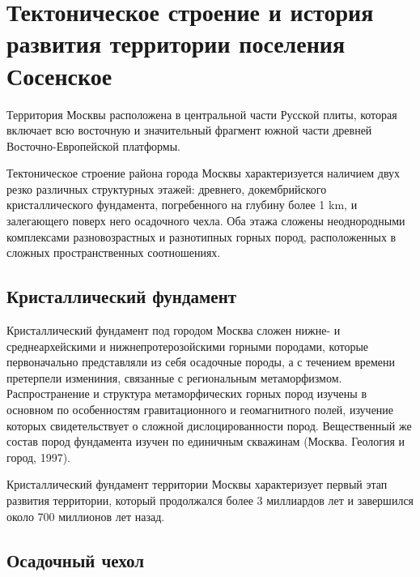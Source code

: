 \section{Тектоническое строение и история развития территории поселения Сосенское}\label{sec:ch2/sec2}

Территория Москвы расположена  в центральной части
Русской плиты, которая включает всю восточную и значительный фрагмент южной части древней
Восточно-Европейской платформы. 

Тектоническое строение района города Москвы характеризуется наличием двух резко различных
структурных этажей: древнего, докембрийского кристаллического фундамента, погребенного 
на глубину более 1 \si{\kilo\meter}, и залегающего поверх него осадочного чехла.
Оба этажа сложены неоднородными комплексами разновозрастных и разнотипных горных пород, 
расположенных в сложных пространственных соотношениях.

\subsection{Кристаллический фундамент}

Кристаллический фундамент под городом Москва сложен нижне- и среднеархейскими и 
нижнепротерозойскими горными породами, которые первоначально представляли из себя 
осадочные породы, а с течением времени претерпели измениния, связанные с региональным 
метаморфизмом. Распространение и структура метаморфических горных пород изучены в 
основном по особенностям гравитационного и геомагнитного полей, изучение которых свидетельствует 
о сложной дислоцированности пород. Вещественный же состав пород фундамента изучен по 
единичным скважинам (Москва. Геология и город, 1997). 

Кристаллический фундамент территории Москвы характеризует первый этап развития территории,
который продолжался более 3 миллиардов лет и завершился около 700 миллионов лет назад.

\subsection{Осадочный чехол}

